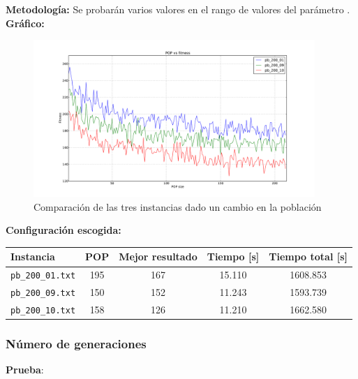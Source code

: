 \textbf{Metodología:} Se probarán varios valores en el rango de valores del parámetro \blue{[10,210]}.\\

\textbf{Gráfico:}\\

\begin{figure}[h!]
\begin{center}
	\includegraphics[width=0.95\textwidth]{img/1.pdf}
	\caption{Comparaci\'on de las tres instancias dado un cambio en la poblaci\'on}
	\label{fig:1}
\end{center}
\end{figure}

\textbf{Configuración escogida:}\\

\begin{center}
\begin{tabular}{|l|c|c|c|c|}
	\hline
	\textbf{Instancia} & \textbf{POP} & \textbf{Mejor resultado} & \textbf{Tiempo [s] } & \textbf{Tiempo total [s] }\\\hline
	\texttt{pb\_200\_01.txt} & 195 & 167 & 15.110 & 1608.853 \\\hline 
	\texttt{pb\_200\_09.txt} & 150 & 152 & 11.243 & 1593.739 \\\hline
	\texttt{pb\_200\_10.txt} & 158 & 126 & 11.210 & 1662.580 \\\hline
\end{tabular}
\end{center}

\newpage
\subsubsection{Número de generaciones}

\textbf{Prueba}: \\

